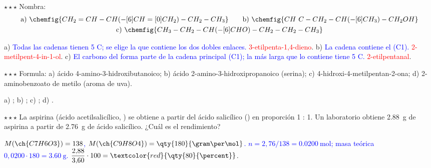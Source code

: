 \begin{exercise}
    \(\star\star\star\) Nombra:
    \begin{gather*}
        \text{a)}\ \chemfig{CH_2=CH-CH(-[6]CH=[0]CH_2)-CH_2-CH_3} \qquad \text{b)}\ \chemfig{CH~C-CH_2-CH(-[6]CH_3)-CH_2OH} \\
        \text{c)}\ \chemfig{CH_3-CH_2-CH(-[6]CHO)-CH_2-CH_2-CH_3}
    \end{gather*}
    \begin{solu}
        a) \textcolor{blue}{Todas las cadenas tienen 5 C; se elige la que contiene los dos dobles enlaces.}
        \textcolor{red}{3-etilpenta-1,4-dieno}. b) \textcolor{blue}{La cadena contiene el  (C1).}
        \textcolor{red}{2-metilpent-4-in-1-ol}. c) \textcolor{blue}{El carbono del  forma parte de la cadena principal (C1);
        la más larga que lo contiene tiene 5 C.} \textcolor{red}{2-etilpentanal}.
    \end{solu}
\end{exercise}

\begin{exercise}
    \(\star\star\star\) Formula: a) ácido 4-amino-3-hidroxibutanoico; b) ácido 2-amino-3-hidroxipropanoico (serina); c)
    4-hidroxi-4-metilpentan-2-ona; d) 2-aminobenzoato de metilo (aroma de uva).
    \begin{solu}
        a) \textcolor{red}{}; b) \textcolor{red}{};
        c) \textcolor{red}{}; d) \textcolor{red}{}.
    \end{solu}
\end{exercise}

\begin{exercise}
    \(\star\star\star\) La aspirina (ácido acetilsalicílico, ) se obtiene a partir del ácido salicílico () en
    proporción 1 : 1. Un laboratorio obtiene \qty{2.88}{\gram} de aspirina a partir de \qty{2.76}{\gram} de ácido salicílico. ¿Cuál
    es el rendimiento?
    \begin{solu}
        \textcolor{blue}{\(M(\ch{C7H6O3}) = 138\), \(M(\ch{C9H8O4}) = \qty{180}{\gram\per\mol}\). \(n = 2{,}76/138 = \qty{0.0200}{\mol}\);
        masa teórica \(0{,}0200 \cdot 180 = \qty{3.60}{\gram}\).} \(\dfrac{2{,}88}{3{,}60} \cdot 100 = \textcolor{red}{\qty{80}{\percent}}\).
    \end{solu}
\end{exercise}

